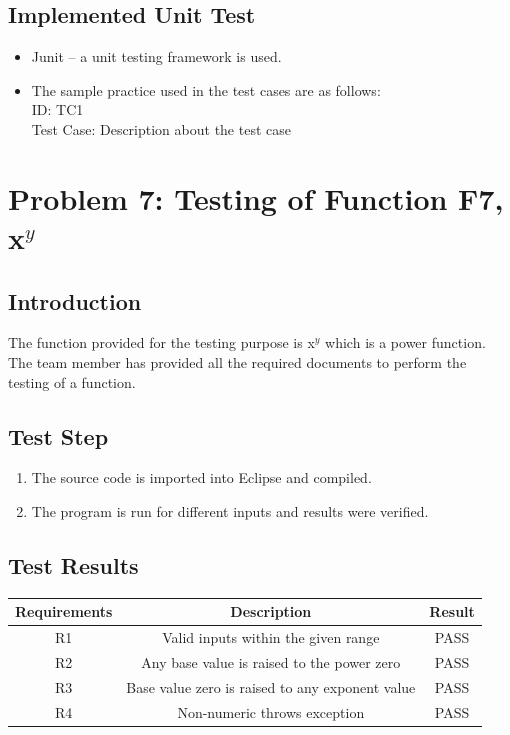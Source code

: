 \documentclass[a4paper,12pt]{article}
\begin{document}
    \subsection{Implemented Unit Test}
    \begin{itemize}
        \item Junit – a unit testing framework is used.
        \item The sample practice used in the test cases are as follows: \\
            ID: TC1 \\
            Test Case: Description about the test case \\
    \end{itemize}
    
    \newpage
    \section{Problem 7: Testing of Function F7, x$^y$}
    \subsection{Introduction}
    The function provided for the testing purpose is x$^y$ which is a power function. The team member has provided all the required documents to perform the testing of a function.
    \subsection{Test Step}
    \begin{enumerate}
        \item The source code is imported into Eclipse and compiled.
        \item The program is run for different inputs and results were verified.
    \end{enumerate}
    
    \subsection{Test Results}
    \begin{center}
    \begin{tabular}{||c c c||} 
     \hline
     Requirements & Description & Result \\ 
     \hline\hline
     R1 & Valid inputs within the given range & PASS \\ 
     \hline
     R2 & Any base value is raised to the power zero & PASS \\
     \hline
     R3 & Base value zero is raised to any exponent value & PASS \\
     \hline
     R4 & Non-numeric throws exception & PASS \\
     \hline
    \end{tabular}
    \end{center}
    
\end{document}
